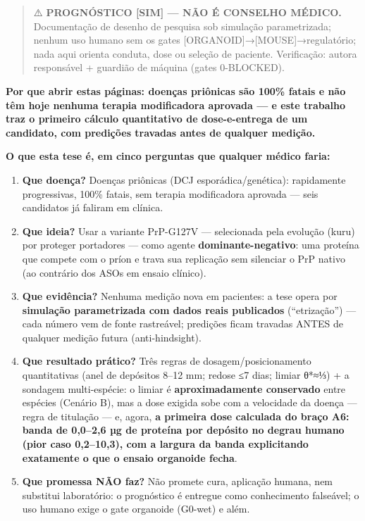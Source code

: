 \documentclass[12pt,a4paper,oneside]{report}
\providecommand{\tightlist}{\setlength{\itemsep}{2pt}\setlength{\parskip}{0pt}}
\begin{document}
\begin{quote}
⚠️ \textbf{PROGNÓSTICO {[}SIM{]} --- NÃO É CONSELHO MÉDICO.}
Documentação de desenho de pesquisa sob simulação parametrizada; nenhum
uso humano sem os gates {[}ORGANOID{]}→{[}MOUSE{]}→regulatório; nada
aqui orienta conduta, dose ou seleção de paciente. Verificação: autora
responsável + guardião de máquina (gates 0-BLOCKED).
\end{quote}

\textbf{Por que abrir estas páginas: doenças priônicas são 100\% fatais
e não têm hoje nenhuma terapia modificadora aprovada --- e este trabalho
traz o primeiro cálculo quantitativo de dose-e-entrega de um candidato,
com predições travadas antes de qualquer medição.}

\textbf{O que esta tese é, em cinco perguntas que qualquer médico
faria:}

\begin{enumerate}
\def\labelenumi{\arabic{enumi}.}
\tightlist
\item
  \textbf{Que doença?} Doenças priônicas (DCJ esporádica/genética):
  rapidamente progressivas, 100\% fatais, sem terapia modificadora
  aprovada --- seis candidatos já faliram em clínica.
\item
  \textbf{Que ideia?} Usar a variante PrP-G127V --- selecionada pela
  evolução (kuru) por proteger portadores --- como agente
  \textbf{dominante-negativo}: uma proteína que compete com o príon e
  trava sua replicação sem silenciar o PrP nativo (ao contrário dos ASOs
  em ensaio clínico).
\item
  \textbf{Que evidência?} Nenhuma medição nova em pacientes: a tese
  opera por \textbf{simulação parametrizada com dados reais publicados}
  (``etrização'') --- cada número vem de fonte rastreável; predições
  ficam travadas ANTES de qualquer medição futura (anti-hindsight).
\item
  \textbf{Que resultado prático?} Três regras de dosagem/posicionamento
  quantitativas (anel de depósitos 8--12 mm; redose ≤7 dias; limiar
  θ*≈⅓) + a sondagem multi-espécie: o limiar é \textbf{aproximadamente
  conservado} entre espécies (Cenário B), mas a dose exigida sobe com a
  velocidade da doença --- regra de titulação --- e, agora, \textbf{a
  primeira dose calculada do braço A6: banda de 0,0--2,6 µg de proteína
  por depósito no degrau humano (pior caso 0,2--10,3), com a largura da
  banda explicitando exatamente o que o ensaio organoide fecha}.
\item
  \textbf{Que promessa NÃO faz?} Não promete cura, aplicação humana, nem
  substitui laboratório: o prognóstico é entregue como conhecimento
  falseável; o uso humano exige o gate organoide (G0-wet) e além.
\end{enumerate}
\end{document}
